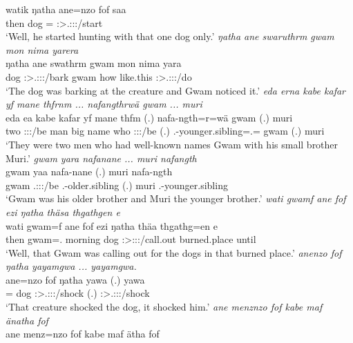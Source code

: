 \begin{exe}
	\gll watik ŋatha ane=nzo fof saa\\ 
	then dog \Dem={\Only} {\Emph} \Sg:\Sbj>\Tsg.\Masc:\Obj:\Pst:\Pfv/start\\
	\trans `Well, he started hunting with that one dog only.'
	\emph{ŋatha ane swaruthrm gwam mon nima yarera}\\
	\gll ŋatha ane swathrm gwam mon nima yara\\ 
	dog {\Dem} \Sg:\Sbj>\Tsg.\Masc:\Io:\Pst:\Dur/bark gwam how like.this \Sg:\Sbj>\Tsg.\Masc:\Io:\Pst:\Ipfv/do\\
	\trans `The dog was barking at the creature and Gwam noticed it.'
	\emph{eda erna kabe kafar yf mane thfrnm ... nafangthrwä gwam ... muri}\\
	\gll eda ea kabe kafar yf mane thfm (.) nafa-ngth=r=wä gwam (.) muri\\ 
	two \Stdu:\Sbj:\Pst:\Ipfv/be man big name who \Stdu:\Sbj:\Pst:\Dur/be (.) \Third.\Poss-younger.sibling=\Assoc.\Du={\Emph} gwam (.) muri\\
	\trans `They were two men who had well-known names Gwam with his small brother Muri.'
	\emph{gwam yara nafanane ... muri nafangth}\\
	\gll gwam yaa nafa-nane (.) muri nafa-ngth\\ 
	gwam \Tsg.\Masc:\Sbj:\Pst:\Ipfv/be \Third.\Poss-older.sibling (.) muri \Third.\Poss-younger.sibling\\
	\trans `Gwam was his older brother and Muri the younger brother.'
	\emph{wati gwamf ane fof ezi ŋatha thäsa thgathgen e}\\
	\gll wati gwam=f ane fof ezi ŋatha thäa thgathg=en e\\ 
	then gwam=\Erg.{\Sg} {\Dem} {\Emph} morning dog \Sg:\Sbj>\Stpl:\Obj:\Pst:\Pfv/call.out burned.place until\\
	\trans `Well, that Gwam was calling out for the dogs in that burned place.'
	\emph{anenzo fof ŋatha yayamgwa ... yayamgwa.}\\
	\gll ane=nzo fof ŋatha yawa (.) yawa\\ 
	\Dem={\Only} {\Emph} dog \Sg:\Sbj>\Tsg.\Masc:\Obj:\Pst:\Ipfv/shock (.) \Sg:\Sbj>\Tsg.\Masc:\Obj:\Pst:\Ipfv/shock\\
	\trans `That creature shocked the dog, it shocked him.'
	\emph{ane menznzo fof kabe maf änatha fof}\\
	\gll ane menz=nzo fof kabe maf ätha fof\\ 

\end{exe}
